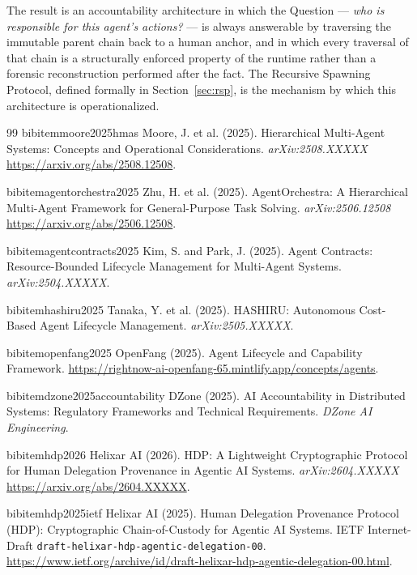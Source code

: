 The result is an accountability architecture in which the Question — \emph{who is responsible for this agent's actions?} — is always answerable by traversing the immutable parent chain back to a human anchor, and in which every traversal of that chain is a structurally enforced property of the runtime rather than a forensic reconstruction performed after the fact. The Recursive Spawning Protocol, defined formally in Section~\ref{sec:rsp}, is the mechanism by which this architecture is operationalized.

\begin{thebibliography}{99}
 bibitem{moore2025hmas}
 Moore, J. et al. (2025). Hierarchical Multi-Agent Systems: Concepts and Operational Considerations. \textit{arXiv:2508.XXXXX} \url{https://arxiv.org/abs/2508.12508}.

 bibitem{agentorchestra2025}
 Zhu, H. et al. (2025). AgentOrchestra: A Hierarchical Multi-Agent Framework for General-Purpose Task Solving. \textit{arXiv:2506.12508} \url{https://arxiv.org/abs/2506.12508}.

 bibitem{agentcontracts2025}
 Kim, S. and Park, J. (2025). Agent Contracts: Resource-Bounded Lifecycle Management for Multi-Agent Systems. \textit{arXiv:2504.XXXXX}.

 bibitem{hashiru2025}
 Tanaka, Y. et al. (2025). HASHIRU: Autonomous Cost-Based Agent Lifecycle Management. \textit{arXiv:2505.XXXXX}.

 bibitem{openfang2025}
 OpenFang (2025). Agent Lifecycle and Capability Framework. \url{https://rightnow-ai-openfang-65.mintlify.app/concepts/agents}.

 bibitem{dzone2025accountability}
 DZone (2025). AI Accountability in Distributed Systems: Regulatory Frameworks and Technical Requirements. \textit{DZone AI Engineering}.

 bibitem{hdp2026}
 Helixar AI (2026). HDP: A Lightweight Cryptographic Protocol for Human Delegation Provenance in Agentic AI Systems. \textit{arXiv:2604.XXXXX} \url{https://arxiv.org/abs/2604.XXXXX}.

 bibitem{hdp2025ietf}
 Helixar AI (2025). Human Delegation Provenance Protocol (HDP): Cryptographic Chain-of-Custody for Agentic AI Systems. IETF Internet-Draft \texttt{draft-helixar-hdp-agentic-delegation-00}. \url{https://www.ietf.org/archive/id/draft-helixar-hdp-agentic-delegation-00.html}.


\end{thebibliography}
